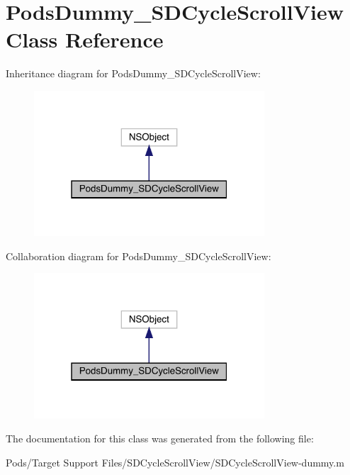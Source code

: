 \hypertarget{interface_pods_dummy___s_d_cycle_scroll_view}{}\section{Pods\+Dummy\+\_\+\+S\+D\+Cycle\+Scroll\+View Class Reference}
\label{interface_pods_dummy___s_d_cycle_scroll_view}


Inheritance diagram for Pods\+Dummy\+\_\+\+S\+D\+Cycle\+Scroll\+View\+:\nopagebreak
\begin{figure}[H]
\begin{center}
\leavevmode
\includegraphics[width=244pt]{interface_pods_dummy___s_d_cycle_scroll_view__inherit__graph}
\end{center}
\end{figure}


Collaboration diagram for Pods\+Dummy\+\_\+\+S\+D\+Cycle\+Scroll\+View\+:\nopagebreak
\begin{figure}[H]
\begin{center}
\leavevmode
\includegraphics[width=244pt]{interface_pods_dummy___s_d_cycle_scroll_view__coll__graph}
\end{center}
\end{figure}


The documentation for this class was generated from the following file\+:\begin{DoxyCompactItemize}
\item 
Pods/\+Target Support Files/\+S\+D\+Cycle\+Scroll\+View/S\+D\+Cycle\+Scroll\+View-\/dummy.\+m\end{DoxyCompactItemize}
